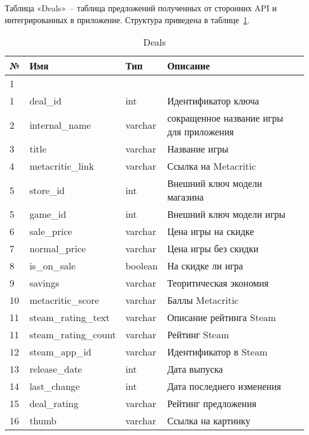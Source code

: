 Таблица «Deals»~-- таблица предложений полученных от сторонних API и интегрированных в приложение. Структура приведена в таблице~\ref{table:func:deals}.~\par
\begin{table}[H]
\caption{Deals}
\label{table:func:deals}
 \centering
 \begin{tabular}
 {| >{\raggedright}m{}
 | >{\centering}m{}
 | >{\centering}m{}
 | >{\centering\arraybackslash}m{}|}
   \hline
   № & Имя & Тип & Описание \\
   \hline
   1 & 2 & 3 & 4 \\
 
   \hline
   1 & deal\_id & int & Идентификатор ключа \\
   \hline
   2 & internal\_name & varchar & сокращенное название игры для приложения \\
   \hline
   3 & title & varchar & Название игры \\
   \hline
   4 & metacritic\_link & varchar & Ссылка на Metacritic \\
   \hline
   5 & store\_id & int & Внешний ключ модели магазина \\
   \hline
   5 & game\_id & int & Внешний ключ модели игры\\
   \hline
   6 & sale\_price & varchar & Цена игры на скидке\\
   \hline
   7 & normal\_price & varchar & Цена игры без скидки\\
   \hline
   8 & is\_on\_sale & boolean & На скидке ли игра\\
   \hline
   9 & savings & varchar & Теоритическая экономия\\
   \hline
   10 & metacritic\_score & varchar & Баллы Metacritic\\
   \hline
   11 & steam\_rating\_text & varchar & Описание рейтинга Steam\\
   \hline
   11 & steam\_rating\_count & varchar & Рейтинг Steam\\
   \hline
   12 & steam\_app\_id & varchar & Идентификатор в Steam\\
   \hline
   13 & release\_date & int & Дата выпуска\\
   \hline
   14 & last\_change & int & Дата последнего изменения\\
   \hline
   15 & deal\_rating & varchar & Рейтинг предложения\\
   \hline
   16 & thumb & varchar & Ссылка на картинку\\
   \hline
 \end{tabular}
\end{table}
